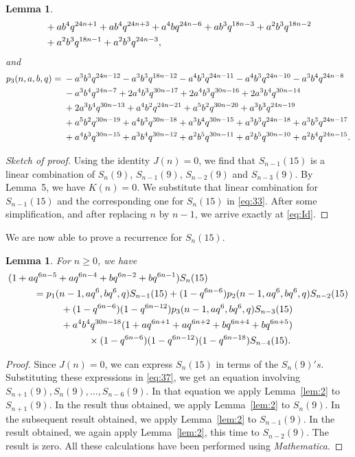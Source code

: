 \documentclass[12pt,twoside]{amsart}
\newtheorem{Lemma}[Theorem]{Lemma}
\theoremstyle{remark}
\numberwithin{equation}{section}
\begin{document}
\begin{Lemma}
\begin{align}
\notag
&+ab^4q^{24n+1}+ab^4q^{24n+3}+a^4bq^{24n-6}+ab^3q^{18n-3}+a^2b^3q^{18n-2}\\
\notag
&+a^2b^3q^{18n-1}+a^2b^3q^{24n-3},
\end{align}
and
\begin{align} \label{eq:36}
 p_3(n,a,b,q) ={}&
-a^3b^3q^{24n-12}-a^3b^3q^{18n-12}-a^4b^3q^{24n-11}-a^4b^3q^{24n-10}-a^3b^4q^{24n-8}\\
\notag
&-a^3b^4q^{24n-7}+2a^4b^3q^{30n-17}+2a^4b^3q^{30n-16}+2a^3b^4q^{30n-14}\\
\notag
&+2a^3b^4q^{30n-13}+a^4b^2q^{24n-21}+a^5b^2q^{30n-20}+a^3b^3q^{24n-19}\\
\notag
&+a^5b^2q^{30n-19}+a^4b^3q^{30n-18}+a^3b^4q^{30n-15}+a^3b^3q^{24n-18}+a^3b^3q^{24n-17}\\
\notag
&+a^4b^3q^{30n-15}+a^3b^4q^{30n-12}+a^2b^5q^{30n-11}+a^2b^5q^{30n-10}+a^2b^4q^{24n-15}.
\end{align}
\end{Lemma}

\begin{proof}[Sketch of proof]
Using the identity $J(n) = 0$, we find that $S_{n-1}(15)$ is a linear
combination of $S_n(9)$, $S_{n-1}(9)$, $S_{n-2}(9)$ and $S_{n-3}(9).$
By Lemma~5, we have $K(n) = 0.$ We substitute that linear combination
for $S_{n-1}(15)$ and the corresponding one for
$S_{n}(15)$ in \eqref{eq:33}. 
After some simplification, and after replacing $n$ by $n-1$,
we arrive exactly at \eqref{eq:Id}.
\end{proof}

We are now able to prove a recurrence for $S_n(15)$.

\begin{Lemma}\label{lem:3}
For $n\geq 0$, we have
\begin{align} \label{eq:37}
 (1+a&q^{6n-5}+aq^{6n-4}+bq^{6n-2}+bq^{6n-1})S_n(15)\\
\notag
&=
p_1(n-1,aq^6,bq^6,q)S_{n-1}(15)+(1-q^{6n-6})p_2(n-1,aq^6,bq^6,q)S_{n-2}(15)\\
\notag
&\kern1cm
+(1-q^{6n-6})(1-q^{6n-12})p_3(n-1,aq^6,bq^6,q)S_{n-3}(15)\\
\notag
&\kern1cm
+a^4b^4q^{30n-18}
(1+aq^{6n+1}+aq^{6n+2}+bq^{6n+4}+bq^{6n+5})\\
\notag
&\kern2cm\times(1-q^{6n-6})(1-q^{6n-12})(1-q^{6n-18})S_{n-4}(15).
\end{align}
\end{Lemma}

\begin{proof}
Since $J(n) = 0$, we can express $S_{n}(15)$ in terms of the $S_{n}(9)'s.$
Substituting these expressions in \eqref{eq:37},
we get an equation involving $S_{n+1}(9),S_{n}(9),\dots,
S_{n-6}(9).$ In that equation we apply Lemma~\ref{lem:2}
to $S_{n+1}(9).$ In the result thus obtained,
we apply Lemma~\ref{lem:2} to $S_{n}(9).$ In the subsequent result
obtained, we apply Lemma~\ref{lem:2} to $S_{n-1}(9).$
In the result obtained, we again apply Lemma~\ref{lem:2}, this time
to $S_{n-2}(9)$. The result is zero. All these calculations
have been performed using {\sl Mathematica}.
\end{proof}
\end{document}
